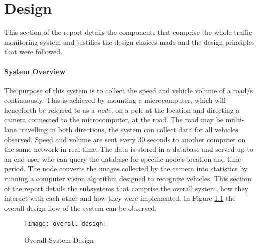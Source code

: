 \chapter{Design}

This section of the report details the components that comprise the whole traffic monitoring system and justifies the design choices made and the design principles that were followed.

\subsubsection{System Overview}

The purpose of this system is to collect the speed and vehicle volume of a road/s continuously. This is achieved by mounting a microcomputer, which will henceforth be referred to as a \emph{node}, on a pole at the location and directing a camera connected to the microcomputer, at the road. The road may be multi-lane travelling in both directions, the system can collect data for all vehicles observed. Speed and volume are sent every 30 seconds to another computer on the same network in real-time. The data is stored in a database and served up to an end user who can query the database for specific node's location and time period. The node converts the images collected by the camera into statistics by running a computer vision algorithm designed to recognize vehicles. This section of the report details the subsystems that comprise the overall system, how they interact with each other and how they were implemented. In Figure \ref{fig:overall_design} the overall design flow of the system can be observed. 

\begin{figure}[H]
    \centering
    \texttt{[image: overall\_design]}
    \caption{Overall System Design}
    \label{fig:overall_design}
\end{figure}




